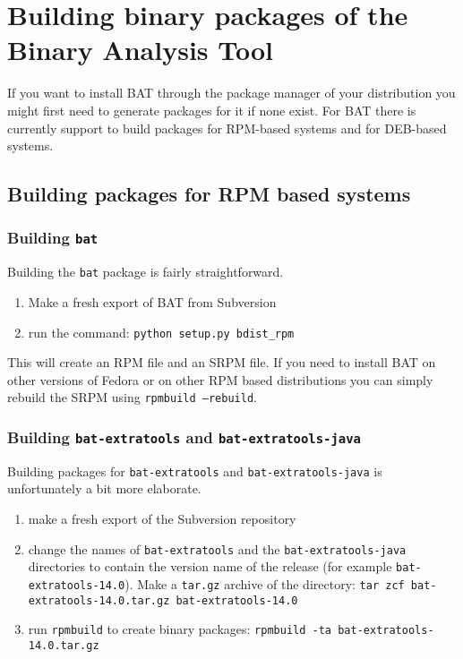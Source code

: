 \documentclass[10pt]{article}
\begin{document}
\section{Building binary packages of the Binary Analysis Tool}

If you want to install BAT through the package manager of your distribution you
might first need to generate packages for it if none exist. For BAT there is
currently support to build packages for RPM-based systems and for DEB-based
systems.

\subsection{Building packages for RPM based systems}

\subsubsection{Building \texttt{bat}}

Building the \texttt{bat} package is fairly straightforward.

\begin{enumerate}
\item Make a fresh export of BAT from Subversion
\item run the command: \texttt{python setup.py bdist\_rpm}
\end{enumerate}

This will create an RPM file and an SRPM file. If you need to install BAT on
other versions of Fedora or on other RPM based distributions you can simply
rebuild the SRPM using \texttt{rpmbuild --rebuild}.

\subsubsection{Building \texttt{bat-extratools} and
\texttt{bat-extratools-java}}

Building packages for \texttt{bat-extratools} and \texttt{bat-extratools-java}
is unfortunately a bit more elaborate.

\begin{enumerate}
\item make a fresh export of the Subversion repository
\item change the names of \texttt{bat-extratools} and the
\texttt{bat-extratools-java} directories to contain the version name of the
release (for example \texttt{bat-extratools-14.0}). Make a \texttt{tar.gz}
archive of the directory:
\texttt{tar zcf bat-extratools-14.0.tar.gz bat-extratools-14.0}
\item run \texttt{rpmbuild} to create binary packages:
\texttt{rpmbuild -ta bat-extratools-14.0.tar.gz}
\end{enumerate}
\end{document}
